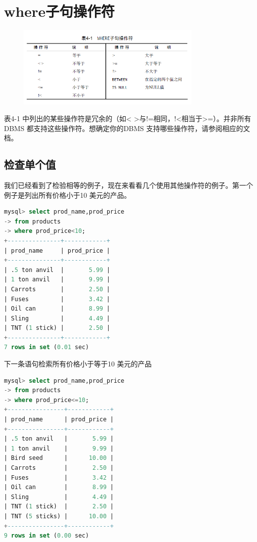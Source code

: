 \documentclass[11pt,a4paper,oneside]{book}
\begin{document}
\section{where子句操作符}
\begin{figure}[H]
	\centering
	\includegraphics[width=0.8\textwidth]{2.png}
\end{figure}
表4-1 中列出的某些操作符是冗余的（如< >与!=相同，!<相当于>=）。并非所有DBMS 都支持这些操作符。想确定你的DBMS 支持哪些操作符，请参阅相应的文档。

\subsection{检查单个值}
我们已经看到了检验相等的例子，现在来看看几个使用其他操作符的例子。第一个例子是列出所有价格小于10 美元的产品。
\begin{lstlisting}[language=sql]
mysql> select prod_name,prod_price
-> from products
-> where prod_price<10;
+---------------+------------+
| prod_name     | prod_price |
+---------------+------------+
| .5 ton anvil  |       5.99 |
| 1 ton anvil   |       9.99 |
| Carrots       |       2.50 |
| Fuses         |       3.42 |
| Oil can       |       8.99 |
| Sling         |       4.49 |
| TNT (1 stick) |       2.50 |
+---------------+------------+
7 rows in set (0.01 sec)
\end{lstlisting}
下一条语句检索所有价格小于等于10 美元的产品
\begin{lstlisting}[language=sql]
mysql> select prod_name,prod_price
-> from products
-> where prod_price<=10;
+----------------+------------+
| prod_name      | prod_price |
+----------------+------------+
| .5 ton anvil   |       5.99 |
| 1 ton anvil    |       9.99 |
| Bird seed      |      10.00 |
| Carrots        |       2.50 |
| Fuses          |       3.42 |
| Oil can        |       8.99 |
| Sling          |       4.49 |
| TNT (1 stick)  |       2.50 |
| TNT (5 sticks) |      10.00 |
+----------------+------------+
9 rows in set (0.00 sec)
\end{lstlisting}
\end{document}

